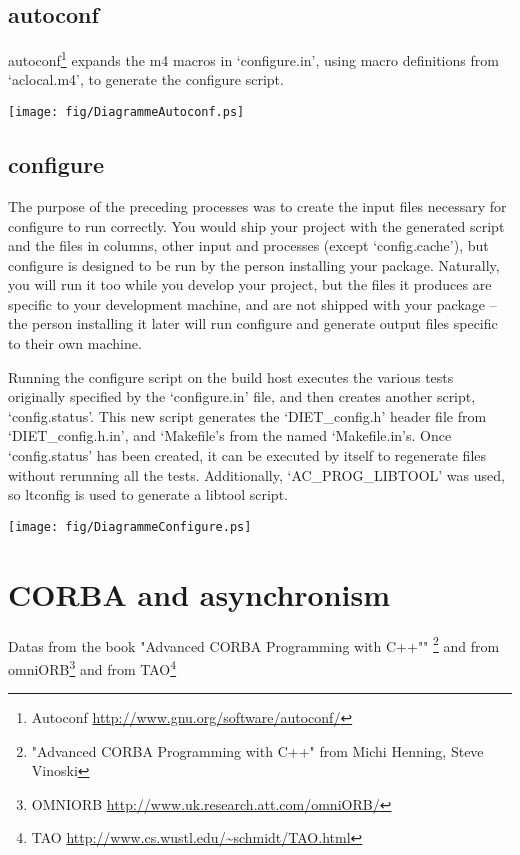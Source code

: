 \subsection{autoconf}
autoconf\footnote{Autoconf {\url{http://www.gnu.org/software/autoconf/}}} expands the m4 macros in `configure.in', using macro 
definitions from `aclocal.m4', to generate the configure script.
\begin{center}
\texttt{[image: fig/DiagrammeAutoconf.ps]}
\end{center}

\subsection{configure}
The purpose of the preceding processes was to create the input files necessary
for configure to run correctly. You would ship your project with the generated
script and the files in columns, other input and processes (except 
`config.cache'), but configure is designed to be run by the person installing
your package. Naturally, you will run it too while you develop your project,
but the files it produces are specific to your development machine, and are
not shipped with your package -- the person installing it later will run 
configure and generate output files specific to their own machine.

Running the configure script on the build host executes the various tests 
originally specified by the `configure.in' file, and then creates another script,
`config.status'. This new script generates the `DIET\_config.h' header file from 
`DIET\_config.h.in', and `Makefile's from the named `Makefile.in's. Once 
`config.status' has been created, it can be executed by itself to regenerate
files without rerunning all the tests. Additionally, `AC\_PROG\_LIBTOOL'
was used, so ltconfig is used to generate a libtool script. 

\begin{center}
\texttt{[image: fig/DiagrammeConfigure.ps]}
\end{center}

\section{CORBA and asynchronism}
Datas from the book "Advanced CORBA Programming with C++""
\footnote{"Advanced CORBA Programming with C++"  from Michi Henning, Steve Vinoski} and
from omniORB\footnote{OMNIORB {\url{http://www.uk.research.att.com/omniORB/}}}
and from TAO\footnote{TAO {\url{http://www.cs.wustl.edu/~schmidt/TAO.html}}
}

